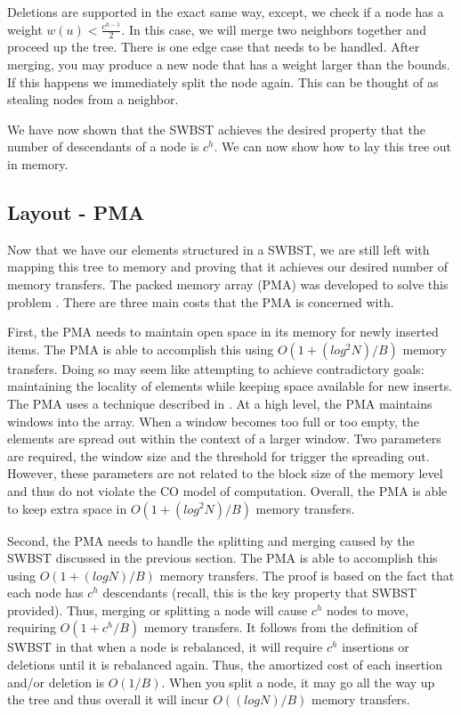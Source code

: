\documentclass{style}
\begin{document}
Deletions are supported in the exact same way, except, we check if a node has
a weight $w(u) < \frac{c^{h-1}}{2}$. In this case, we will merge two neighbors
together and proceed up the tree. There is one edge case that needs to be
handled. After merging, you may produce a new node that has a weight larger
than the bounds. If this happens we immediately split the node again. This can 
be thought of as stealing nodes from a neighbor.

We have now shown that the SWBST achieves the desired property that the number
of descendants of a node is $c^h$. We can now show how to lay this tree out in
memory.

\subsection{Layout - PMA}
\label{sec:layout}


Now that we have our elements structured in a SWBST, we are still left with
mapping this tree to memory and proving that it achieves our desired number of
memory transfers. The packed memory array (PMA) was developed to solve this
problem \cite{BenderDemainColton}. There are three main costs that the PMA is concerned with.

First, the PMA needs to maintain open space in its memory for newly inserted
items. The PMA is able to accomplish this using $O(1 + (log^2 N) / B)$ memory
transfers. Doing so may seem like attempting to achieve contradictory goals:
maintaining the locality of elements while keeping space available for new
inserts. The PMA uses a technique described in \cite{packedmemoryarray}. At a high level, the PMA
maintains windows into the array. When a window becomes too full or too
empty, the elements are spread out within the context of a larger window. Two
parameters are required, the window size and the threshold for trigger the
spreading out. However, these parameters are not related to the block size of
the memory level and thus do not violate the CO model of computation. Overall,
the PMA is able to keep extra space in $O(1 + (log^2 N) / B)$ memory
transfers.

Second, the PMA needs to handle the splitting and merging caused
by the SWBST discussed in the previous section. The PMA is able to accomplish
this using $O(1 + (log N) /B)$ memory transfers. The proof is based on the
fact that each node has $c^h$ descendants (recall, this is the key property
that SWBST provided). Thus, merging or splitting a node will cause $c^h$ nodes
to move, requiring $O(1 + c^h/B)$ memory transfers. It follows from the
definition of SWBST in \cite{swbst} that when a node is rebalanced, it will require
$c^h$ insertions or deletions until it is rebalanced again. Thus, the
amortized cost of each insertion and/or deletion is $O(1/B)$. When you split a
node, it may go all the way up the tree and thus overall it will incur $O((log
N) / B)$ memory transfers.
\end{document}
